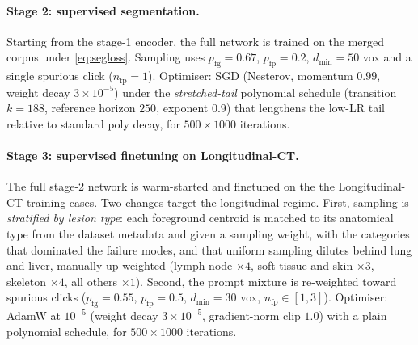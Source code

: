 \paragraph{Stage 2: supervised segmentation.} Starting from the stage-1 encoder,
the full network is trained on the merged corpus under \cref{eq:segloss}. Sampling uses
$p_{\mathrm{fg}}=0.67$, $p_{\mathrm{fp}}=0.2$, $d_{\min}=50$ vox and a single
spurious click ($n_{\mathrm{fp}}=1$). Optimiser: SGD (Nesterov, momentum $0.99$,
weight decay $3\times10^{-5}$) under the \emph{stretched-tail} polynomial schedule
(transition $k=188$, reference horizon $250$, exponent $0.9$) that lengthens the
low-LR tail relative to standard poly decay, for $500\times1000$ iterations.
 
\paragraph{Stage 3: supervised finetuning on Longitudinal-CT.} The full stage-2
network is warm-started and finetuned on the the Longitudinal-CT training
cases. Two changes target the longitudinal regime. First,
sampling is \emph{stratified by lesion type}: each foreground centroid is matched
to its anatomical type from the dataset metadata and given a sampling weight, with
the categories that dominated the failure modes, and that uniform sampling dilutes
behind lung and liver, manually up-weighted (lymph node $\times4$, soft tissue and
skin $\times3$, skeleton $\times4$, all others $\times1$). Second, the prompt
mixture is re-weighted toward spurious clicks ($p_{\mathrm{fg}}=0.55$,
$p_{\mathrm{fp}}=0.5$, $d_{\min}=30$ vox, $n_{\mathrm{fp}}\in[1,3]$). Optimiser:
AdamW at $10^{-5}$ (weight decay $3\times10^{-5}$, gradient-norm clip $1.0$) with a
plain polynomial schedule, for $500\times1000$ iterations.
 
